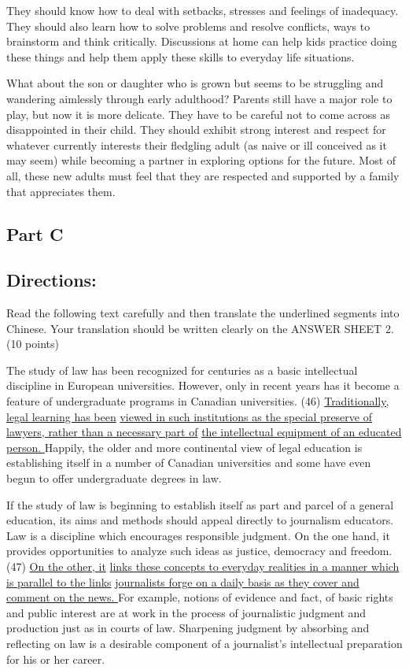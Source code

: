 \documentclass[UTF8,11pt]{ctexart}
\begin{document}
They should know how to deal with setbacks, stresses and feelings of inadequacy. They should also learn how to solve problems and resolve conflicts, ways to brainstorm and think critically. Discussions at home can help kids practice doing these things and help them apply these skills to everyday life situations.


What about the son or daughter who is grown but seems to be struggling and wandering aimlessly through early adulthood? Parents still have a major role to play, but now it is more delicate. They have to be careful not to come across as disappointed in their child. They should exhibit strong interest and respect for whatever currently interests their fledgling adult (as naive or ill conceived as it may seem) while becoming a partner in exploring options for the future. Most of all, these new adults must feel that they are respected and supported by a family that appreciates them.


\subsection*{\textbf{Part C}}


\subsection*{\textbf{Directions:}}


Read the following text carefully and then translate the underlined segments into Chinese. Your translation should be written clearly on the ANSWER SHEET 2. (10 points)


The study of law has been recognized for centuries as a basic intellectual discipline in European universities. However, only in recent years has it become a feature of undergraduate programs in Canadian universities. (46) \uline{Traditionally, legal learning has been} \uline{viewed in such institutions as the special preserve of lawyers, rather than a necessary part of} \uline{the intellectual equipment of an educated person. }Happily, the older and more continental view of legal education is establishing itself in a number of Canadian universities and some have even begun to offer undergraduate degrees in law.


If the study of law is beginning to establish itself as part and parcel of a general education, its aims and methods should appeal directly to journalism educators. Law is a discipline which encourages responsible judgment. On the one hand, it provides opportunities to analyze such ideas as justice, democracy and freedom. (47) \uline{On the other, it} \uline{links these concepts to everyday realities in a manner which is parallel to the links} \uline{journalists forge on a daily basis as they cover and comment on the news. }For example, notions of evidence and fact, of basic rights and public interest are at work in the process of journalistic judgment and production just as in courts of law. Sharpening judgment by absorbing and reflecting on law is a desirable component of a journalist’s intellectual preparation for his or her career.
\end{document}
